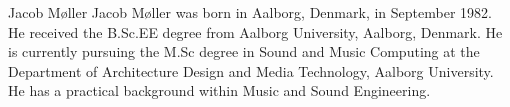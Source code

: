 \begin{IEEEbiography}{Jacob Møller}
    Jacob Møller was born in Aalborg, Denmark, in September 1982. He received the B.Sc.EE degree from Aalborg University, Aalborg, Denmark. He is currently pursuing the M.Sc degree in Sound and Music Computing at the Department of Architecture Design and Media Technology, Aalborg University. He has a practical background within Music and Sound Engineering.
\end{IEEEbiography}

%
